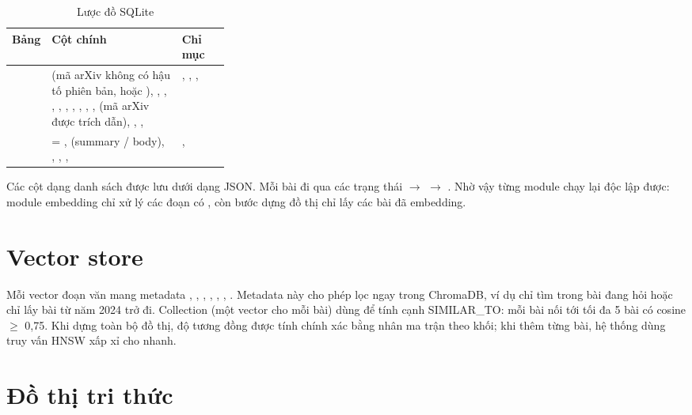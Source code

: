 \begin{table}[H]
\centering\small{}
\begin{tabularx}{\linewidth}{@{}P{0.1\linewidth}LP{0.22\linewidth}@{}}
\toprule
\textbf{Bảng} & \textbf{Cột chính} & \textbf{Chỉ mục}\\
\midrule
{} &  (mã arXiv không có hậu tố phiên bản, hoặc ), , , , , , , , , ,  (mã arXiv được trích dẫn), , ,  & , , , \\
 &  = ,  (summary / body), , , ,  & , \\
\bottomrule
\end{tabularx}
\caption{Lược đồ SQLite}\label{tab:sqlite}
\end{table}

Các cột dạng danh sách được lưu dưới dạng JSON. Mỗi bài đi qua các trạng thái
 $\to$  $\to$ . Nhờ vậy từng module chạy lại độc lập được: module
embedding chỉ xử lý các đoạn có , còn bước dựng đồ thị chỉ lấy các bài đã embedding.

\section{Vector store}

Mỗi vector đoạn văn mang metadata , , , , ,
, . Metadata này cho phép lọc ngay trong ChromaDB, ví dụ chỉ tìm trong bài đang hỏi hoặc chỉ
lấy bài từ năm 2024 trở đi. Collection  (một vector cho mỗi bài) dùng để tính cạnh SIMILAR\_TO: mỗi
bài nối tới tối đa 5 bài có cosine $\geq$ 0,75. Khi dựng toàn bộ đồ thị, độ tương đồng được tính chính xác bằng nhân
ma trận theo khối; khi thêm từng bài, hệ thống dùng truy vấn HNSW xấp xỉ cho nhanh.

\section{Đồ thị tri thức}

